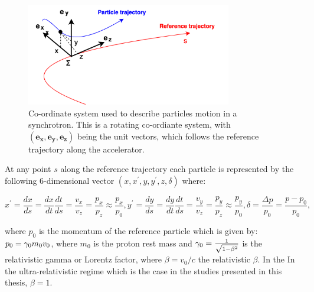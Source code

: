 \begin{figure}[!h] %
    \centering         
    \includegraphics[width=0.8\textwidth]{images/Ch2/coordinates_particle_motion.png}
        \caption{Co-ordinate system used to describe particles motion in a synchrotron. This is a rotating co-ordiante system, with $(\mathbf{e_x, e_y, e_z})$ being the unit vectors, which follows the reference trajectory along the accelerator.}
        \label{fig:coordinate_system}
 \end{figure}


 At any point $s$ along the reference trajectory each particle is represented by the following 6-dimensional vector $(x, x^{\prime}, y, y^{\prime}, z, \delta)$ where:

 \begin{subequations}\label{eq:particle_coordinates}
    \begin{equation}
        x^\prime = \frac{dx}{ds} = \frac{dx}{dt}\frac{dt}{ds} = \frac{v_x}{v_z} =  \frac{p_x}{p_z} \approx \frac{p_x}{p_0},
    \end{equation}    
    \begin{equation}
        y^\prime = \frac{dy}{ds} = \frac{dy}{dt}\frac{dt}{ds} = \frac{v_y}{v_z} =  \frac{p_y}{p_z} 	\approx \frac{p_y}{p_0},
    \end{equation} 
    \begin{equation}
        \delta = \frac{\Delta p}{p_0} = \frac{p-p_0}{p_0},
    \end{equation}
\end{subequations}

where $p_0$ is the momentum of the reference particle which is given by: $p_0 = {\gamma_0} m_0 v_0$, where $m_0$ is the proton rest mass and ${\gamma_0} = \frac{1}{\sqrt{1-\beta^2}}$ is the relativistic gamma or Lorentz factor, where $\beta=v_0/c$ the relativistic $\beta$. In the In the ultra-relativistic regime which is the case in the studies presented in this thesis, $\beta=1$.

